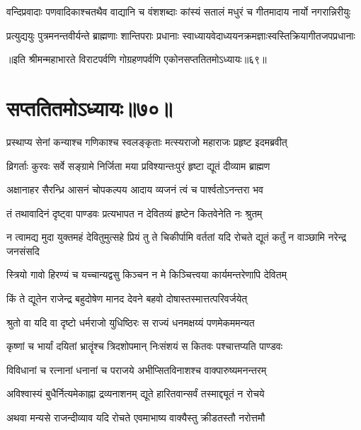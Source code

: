 \twolineshloka
{वन्दिप्रवादाः पणवादिकाश्चतथैव वाद्यानि च वंशशब्दाः}
{कांस्यं सतालं मधुरं च गीतमादाय नार्यो नगरान्निरीयुः}


\twolineshloka
{प्रत्युद्ययुः पुत्रमनन्तवीर्यन्ते ब्राह्मणाः शान्तिपराः प्रधानाः}
{स्वाध्यायवेदाध्ययनक्रमज्ञाःस्वस्तिक्रियागीतजपप्रधानाः}

॥इति श्रीमन्महाभारते विराटपर्वणि गोग्रहणपर्वणि एकोनसप्ततितमोऽध्यायः॥६९॥

\chapter{सप्ततितमोऽध्यायः॥७०॥}

\twolineshloka
{प्रस्थाप्य सेनां कन्याश्च गणिकाश्च स्वलङ्कृताः}
{मत्स्यराजो महाराजः प्रहृष्ट इदमब्रवीत्}


\twolineshloka
{व्रिगर्ताः कुरवः सर्वे सङ्ग्रामे निर्जिता मया}
{प्रविश्यान्तःपुरं हृष्टा द्यूतं दीव्याम ब्राह्मण}


\twolineshloka
{अक्षानाहर सैरन्ध्रि आसनं चोपकल्पय}
{आदाय व्यजनं त्वं च पार्श्वतोऽनन्तरा भव}


\twolineshloka
{तं तथावादिनं दृष्ट्वा पाण्डवः प्रत्यभापत}
{न देवितव्यं हृष्टेन कितवेनेति नः श्रुतम्}


\threelineshloka
{न त्वामद्य मुदा युक्तमहं देवितुमुत्सहे}
{प्रियं तु ते चिकीर्पामि वर्ततां यदि रोचते}
{द्यूतं कर्तुं न वाञ्छामि नरेन्द्र जनसंसदि}




\twolineshloka
{स्त्रियो गावो हिरण्यं च यच्चान्यद्वसु किञ्चन}
{न मे किञ्चित्त्वया कार्यमन्तरेणापि देवितम्}




\twolineshloka
{किं ते द्यूतेन राजेन्द्र बहुदोषेण मानद}
{देवने बहवो दोषास्तस्मात्तत्परिवर्जयेत्}


\twolineshloka
{श्रुतो वा यदि वा दृष्टो धर्मराजो युधिष्ठिरः}
{स राज्यं धनमक्षय्यं पणमेकममन्यत}


\twolineshloka
{कृष्णां च भार्यां दयितां भ्रातॄंश्च त्रिदशोपमान्}
{निःसंशयं स कितवः पश्चात्तप्यति पाण्डवः}


\twolineshloka
{विविधानां च रत्नानां धनानां च पराजये}
{अभीप्सितविनाशश्च वाक्पारुष्यमनन्तरम्}


\twolineshloka
{अविश्वास्यं बुधैर्नित्यमेकाह्ना द्रव्यनाशनम्}
{द्यूते हारितवान्सर्वं तस्माद्द्यूतं न रोचये}


\twolineshloka
{अथवा मन्यसे राजन्दीव्याव यदि रोचते}
{एवमाभाष्य वाक्यैस्तु क्रीडतस्तौ नरोत्तमौ}


